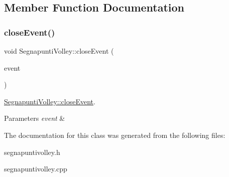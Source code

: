 \subsection{Member Function Documentation}
\mbox{\label{classSegnapuntiVolley_ae73348572db084086209753f299615fd}} 
\subsubsection{\texorpdfstring{close\+Event()}{closeEvent()}}
{\footnotesize\ttfamily void Segnapunti\+Volley\+::close\+Event (\begin{DoxyParamCaption}\item[{Q\+Close\+Event $\ast$}]{event }\end{DoxyParamCaption})}



\mbox{\hyperlink{classSegnapuntiVolley_ae73348572db084086209753f299615fd}{Segnapunti\+Volley\+::close\+Event}}. 


\begin{DoxyParams}{Parameters}
{\em event} & \\
\hline
\end{DoxyParams}


The documentation for this class was generated from the following files\+:\begin{DoxyCompactItemize}
\item 
segnapuntivolley.\+h\item 
segnapuntivolley.\+cpp\end{DoxyCompactItemize}

